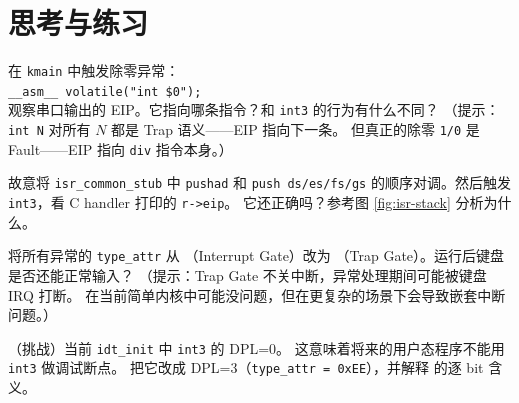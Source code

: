\section{思考与练习}

\begin{exercise}
在 \texttt{kmain} 中触发除零异常：\\
\texttt{\_\_asm\_\_ volatile("int \$0");}\\
观察串口输出的 EIP。它指向哪条指令？和 \texttt{int3} 的行为有什么不同？
（提示：\texttt{int N} 对所有 $N$ 都是 Trap 语义——EIP 指向下一条。
但真正的除零 \texttt{1/0} 是 Fault——EIP 指向 \texttt{div} 指令本身。）
\end{exercise}

\begin{exercise}
故意将 \texttt{isr\_common\_stub} 中 \texttt{pushad} 和 \texttt{push ds/es/fs/gs}
的顺序对调。然后触发 \texttt{int3}，看 C handler 打印的 \texttt{r->eip}。
它还正确吗？参考图 \ref{fig:isr-stack} 分析为什么。
\end{exercise}

\begin{exercise}
将所有异常的 \texttt{type\_attr} 从 （Interrupt Gate）改为
（Trap Gate）。运行后键盘是否还能正常输入？
（提示：Trap Gate 不关中断，异常处理期间可能被键盘 IRQ 打断。
在当前简单内核中可能没问题，但在更复杂的场景下会导致嵌套中断问题。）
\end{exercise}

\begin{exercise}
（挑战）当前 \texttt{idt\_init} 中 \texttt{int3} 的 DPL=0。
这意味着将来的用户态程序不能用 \texttt{int3} 做调试断点。
把它改成 DPL=3（\texttt{type\_attr = 0xEE}），并解释  的逐 bit 含义。
\end{exercise}


